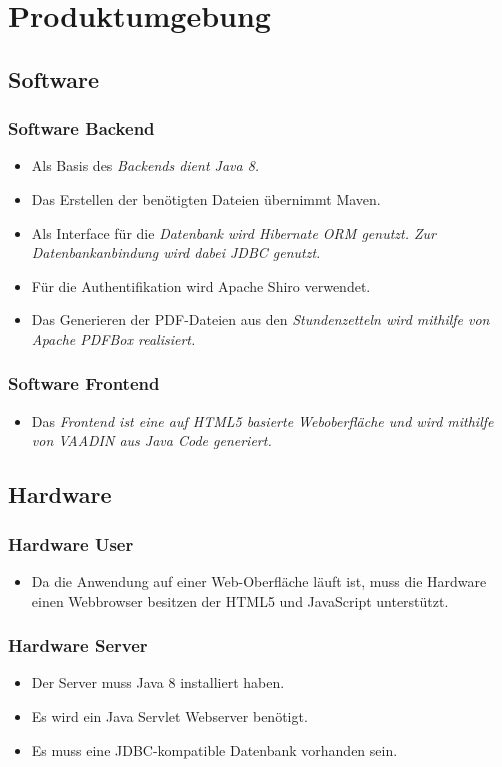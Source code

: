 \section{Produktumgebung}

\subsection{Software}
\subsubsection{Software Backend}
\begin{itemize}
    \item Als Basis des \em Backends \em dient Java 8.
    \item Das Erstellen der benötigten Dateien übernimmt Maven.
    \item Als Interface für die \em Datenbank \em wird Hibernate ORM genutzt.
            Zur Datenbankanbindung wird dabei JDBC genutzt.
    \item Für die Authentifikation wird Apache Shiro verwendet.
    \item Das Generieren der PDF-Dateien aus den \em Stundenzetteln \em wird mithilfe von Apache PDFBox realisiert.
\end{itemize}

\subsubsection{Software Frontend}
\begin{itemize}
    \item Das \em Frontend \em ist eine auf HTML5 basierte Weboberfläche und wird mithilfe von VAADIN aus Java Code generiert.
\end{itemize}

\subsection{Hardware}
\subsubsection{Hardware User}
\begin{itemize}
    \item Da die Anwendung auf einer Web-Oberfläche läuft ist, muss die Hardware einen Webbrowser besitzen der HTML5 und JavaScript unterstützt.
\end{itemize}

\subsubsection{Hardware Server}
\begin{itemize}
    \item Der Server muss Java 8 installiert haben.
    \item Es wird ein Java Servlet Webserver benötigt.
    \item Es muss eine JDBC-kompatible Datenbank vorhanden sein.
\end{itemize}
